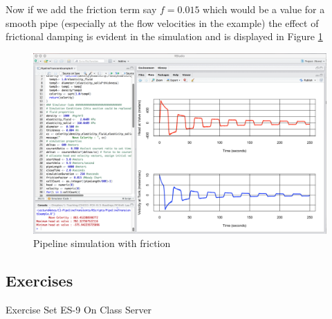 Now if we add the friction term say $f=0.015$ which would be a value for a smooth pipe (especially at the flow velocities in the example) the effect of frictional damping is evident in the simulation and is displayed in 
Figure \ref{fig:PipelineExampleFriction}

\begin{figure}[h!] %
   \centering
   \includegraphics[width=6in]{./11-PipelineTransients/ExampleResultFriction.jpg} 
   \caption{Pipeline simulation with friction}
   \label{fig:PipelineExampleFriction}
\end{figure}


\subsection*{Exercises}
Exercise Set ES-9 On Class Server
